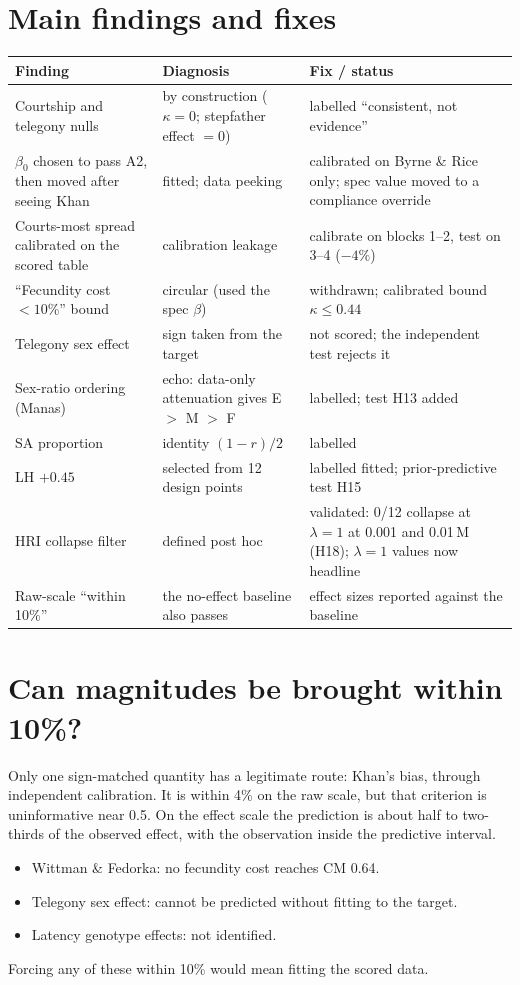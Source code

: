 \section{Main findings and fixes}
\begin{longtable}{p{4.6cm}p{5.2cm}p{5.4cm}}\toprule
Finding & Diagnosis & Fix / status\\\midrule\endhead
Courtship and telegony nulls & by construction ($\kappa=0$; stepfather effect $=0$) & labelled ``consistent, not evidence''\\
$\beta_0$ chosen to pass A2, then moved after seeing Khan & fitted; data peeking & calibrated on Byrne \& Rice only; spec value moved to a compliance override\\
Courts-most spread calibrated on the scored table & calibration leakage & calibrate on blocks 1--2, test on 3--4 ($-4\%$)\\
``Fecundity cost $<10\%$'' bound & circular (used the spec $\beta$) & withdrawn; calibrated bound $\kappa\le0.44$\\
Telegony sex effect & sign taken from the target & not scored; the independent test rejects it\\
Sex-ratio ordering (Manas) & echo: data-only attenuation gives E $>$ M $>$ F & labelled; test H13 added\\
SA proportion & identity $(1-r)/2$ & labelled\\
LH $+0.45$ & selected from 12 design points & labelled fitted; prior-predictive test H15\\
HRI collapse filter & defined post hoc & validated: 0/12 collapse at $\lambda=1$ at 0.001 and 0.01\,M (H18); $\lambda=1$ values now headline\\
Raw-scale ``within 10\%'' & the no-effect baseline also passes & effect sizes reported against the baseline\\\bottomrule
\end{longtable}

\section{Can magnitudes be brought within 10\%?}
Only one sign-matched quantity has a legitimate route: Khan's bias, through independent calibration. It is within 4\% on the raw scale, but that criterion is uninformative near 0.5. On the effect scale the prediction is about half to two-thirds of the observed effect, with the observation inside the predictive interval.
\begin{itemize}
\item Wittman \& Fedorka: no fecundity cost reaches CM 0.64.
\item Telegony sex effect: cannot be predicted without fitting to the target.
\item Latency genotype effects: not identified.
\end{itemize}
Forcing any of these within 10\% would mean fitting the scored data.

